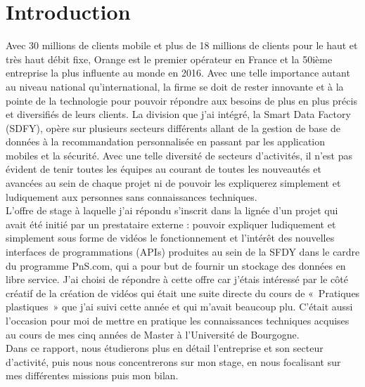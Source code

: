 \chapter*{Introduction}
\label{chap:introduction}

Avec 30 millions de clients mobile et plus de 18 millions de clients  pour le haut et très haut débit fixe, Orange est le premier opérateur en France et la 50ième entreprise la plus influente au monde en 2016. Avec une telle importance autant au niveau national qu'international, la firme se doit de rester innovante et à la pointe de la technologie pour pouvoir répondre aux besoins de plus en plus précis et diversifiés de leurs clients. La division que j’ai intégré, la Smart Data Factory (SDFY), opère sur plusieurs secteurs différents allant de la gestion de base de données à la recommandation personnalisée en passant par les application mobiles et la sécurité. Avec une telle diversité de secteurs d’activités, il n’est pas évident de tenir toutes les équipes au courant de toutes les nouveautés et avancées au sein de chaque projet ni de pouvoir les expliquerez simplement et ludiquement aux personnes sans connaissances techniques.\\
L’offre de stage à laquelle j’ai répondu s’inscrit dans la lignée d’un projet qui avait été initié par un prestataire externe : pouvoir expliquer ludiquement et simplement sous forme de vidéos le fonctionnement et l’intérêt des nouvelles  interfaces de programmations (APIs) produites au sein de la SFDY dans le cardre du programme PnS.com, qui a pour but de fournir un stockage des données en libre service. J’ai choisi de répondre à cette offre car j’étais intéressé par le côté créatif de la création de vidéos qui était une suite directe du cours de « Pratiques plastiques » que j’ai suivi cette année et qui m’avait beaucoup plu. C’était aussi l’occasion pour moi de mettre en pratique les connaissances techniques acquises au cours de mes cinq années de Master à l’Université de Bourgogne.\\
Dans ce rapport, nous étudierons plus en détail l’entreprise et son secteur d’activité, puis nous nous concentrerons sur mon stage, en nous focalisant sur mes différentes missions puis mon bilan.
